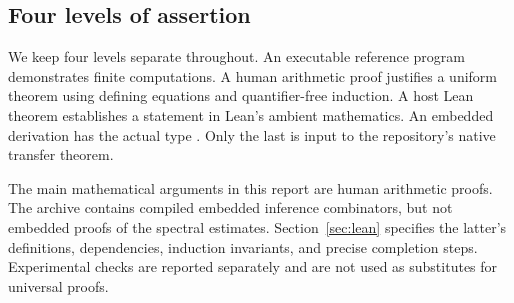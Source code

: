 \subsection{Four levels of assertion}

We keep four levels separate throughout. An executable reference program demonstrates finite computations. A human arithmetic proof justifies a uniform theorem using defining equations and quantifier-free induction. A host Lean theorem establishes a statement in Lean's ambient mathematics. An embedded derivation has the actual type . Only the last is input to the repository's native transfer theorem.

The main mathematical arguments in this report are human arithmetic proofs. The archive contains compiled embedded inference combinators, but not embedded proofs of the spectral estimates. Section~\ref{sec:lean} specifies the latter's definitions, dependencies, induction invariants, and precise completion steps. Experimental checks are reported separately and are not used as substitutes for universal proofs.
